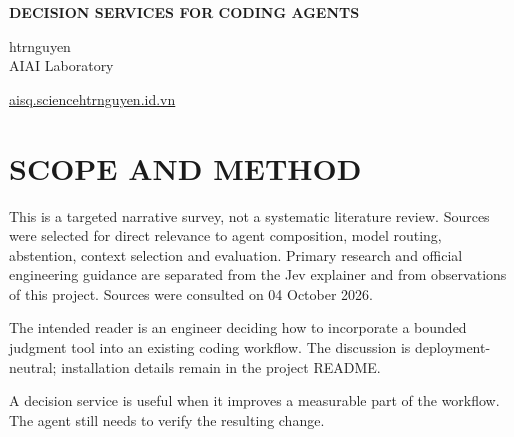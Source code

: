 \documentclass[10pt,a4paper]{article}
\begin{document}
\thispagestyle{firstpage}
\begin{center}
{\Large\bfseries DECISION SERVICES FOR CODING AGENTS\par}
\vspace{8pt}
htrnguyen\\AIAI Laboratory\par
\vspace{4pt}
\href{https://aisq.science/}{aisq.science}\quad\href{https://www.htrnguyen.id.vn/}{htrnguyen.id.vn}\par
\end{center}
\begin{abstract}
Coding agents can generate plans and patches, but many surrounding choices have a small, explicit answer space. This report examines when those choices merit a separate decision service, when deterministic code is preferable, and how uncertainty should affect the workflow. It synthesizes selected research and engineering guidance, then introduces Laya MCP Server as an integration designed to make bounded decisions accessible through a common tool interface. It presents a task-selection framework, an integration contract and a reproducible workflow, illustrated with successful and incorrect predictions. It does not claim new model training, a general benchmark, equivalent quality to Jev or guaranteed productivity gains.
\end{abstract}
\section{SCOPE AND METHOD}
This is a targeted narrative survey, not a systematic literature review. Sources were selected for direct relevance to agent composition, model routing, abstention, context selection and evaluation. Primary research and official engineering guidance are separated from the Jev explainer and from observations of this project. Sources were consulted on 04 October 2026.

The intended reader is an engineer deciding how to incorporate a bounded judgment tool into an existing coding workflow. The discussion is deployment-neutral; installation details remain in the project README.

A decision service is useful when it improves a measurable part of the workflow. The agent still needs to verify the resulting change.
\end{document}

